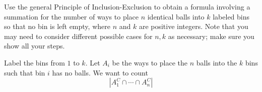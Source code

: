 \documentclass{eh-homework}
\begin{document}
    \begin{question}{1}
        Use the general Principle of Inclusion-Exclusion to obtain a formula involving a summation for the number of ways to place $n$ identical balls into $k$ labeled bins so that no bin is left empty, where $n$ and $k$ are positive integers. Note that you may need to consider different possible cases for $n, k$ as necessary; make sure you show all your steps.

        \tcblower

        Label the bins from \(1\) to \(k\). Let \(A_i\) be the ways to place the \(n\) balls into the \(k\) bins such that bin \(i\) has no balls. We want to count
        \[
            \left|A_1^C \cap \cdots \cap A_n^C\right|
        \]
    \end{question}
\end{document}
